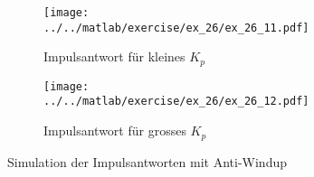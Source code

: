 \begin{figure}[h!]
	\centering
	\begin{subfigure}{0.45\textwidth}
		\texttt{[image: ../../matlab/exercise/ex\_26/ex\_26\_11.pdf]}
		\caption{Impulsantwort für kleines $K_p$}
		\label{fig:ex_26_11}
	\end{subfigure}
	\hfill{}
	\begin{subfigure}{0.45\textwidth}
		\texttt{[image: ../../matlab/exercise/ex\_26/ex\_26\_12.pdf]}
		\caption{Impulsantwort für grosses $K_p$}
	\end{subfigure}
	\caption{Simulation der Impulsantworten mit Anti-Windup}
\end{figure}
